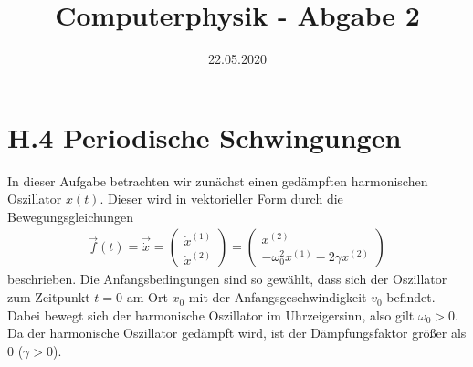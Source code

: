 \documentclass[ngerman]{scrartcl}
\title{Computerphysik - Abgabe 2}
\date{22.05.2020}
\begin{document}
\thispagestyle{fancy}

\section{H.4 Periodische Schwingungen}
In dieser Aufgabe betrachten wir zunächst einen gedämpften harmonischen Oszillator $x(t)$. Dieser wird in vektorieller Form durch die Bewegungsgleichungen
\begin{align}
\vec{f}(t)=\vec{\dot{x}}=\left(\begin{array}{c} \dot{x}^{(1)} \\ \dot{x}^{(2)} \end{array}\right) = \left(\begin{array}{c} x^{(2)} \\ -\omega_{0}^{2}x^{(1)} - 2\gamma x ^{(2)}\end{array}\right)
\end{align} 
beschrieben. Die Anfangsbedingungen sind so gewählt, dass sich der Oszillator zum Zeitpunkt $t=0$ am Ort $x_{0}$ mit der Anfangsgeschwindigkeit $v_{0}$ befindet. Dabei bewegt sich der harmonische Oszillator im Uhrzeigersinn, also gilt $\omega_{0}>0$. Da der harmonische Oszillator gedämpft wird, ist der Dämpfungsfaktor größer als 0 ($\gamma>0$). 
\end{document}

